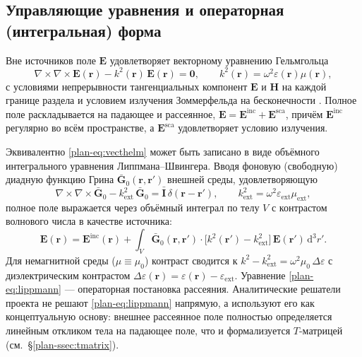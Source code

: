 \documentclass[11pt,a4paper]{article}
\begin{document}
\subsection{Управляющие уравнения и операторная (интегральная) форма}

Вне источников поле $\bm{E}$ удовлетворяет векторному уравнению Гельмгольца
\begin{equation}
\nabla\times\nabla\times\bm{E}(\bm{r})-k^2(\bm{r})\,\bm{E}(\bm{r})=\bm{0},
\qquad k^2(\bm{r})=\omega^2\varepsilon(\bm{r})\mu(\bm{r}),
\label{plan-eq:vecthelm}
\end{equation}
с условиями непрерывности тангенциальных компонент $\bm{E}$ и $\bm{H}$ на каждой границе раздела и условием излучения Зоммерфельда на бесконечности \cite{stratton1941}. Полное поле раскладывается на падающее и рассеянное, $\bm{E}=\bm{E}^{\mathrm{inc}}+\bm{E}^{\mathrm{sca}}$, причём $\bm{E}^{\mathrm{inc}}$ регулярно во всём пространстве, а $\bm{E}^{\mathrm{sca}}$ удовлетворяет условию излучения.

Эквивалентно \eqref{plan-eq:vecthelm} может быть записано в виде объёмного интегрального уравнения Липпмана--Швингера. Вводя фоновую (свободную) диадную функцию Грина $\bar{\bm{G}}_0(\bm{r},\bm{r}')$ внешней среды, удовлетворяющую
\begin{equation}
\nabla\times\nabla\times\bar{\bm{G}}_0-k_{\mathrm{ext}}^2\,\bar{\bm{G}}_0
=\bar{\bm{I}}\,\delta(\bm{r}-\bm{r}'),
\qquad k_{\mathrm{ext}}^2=\omega^2\varepsilon_{\mathrm{ext}}\mu_{\mathrm{ext}},
\label{plan-eq:greendyad}
\end{equation}
полное поле выражается через объёмный интеграл по телу $V$ с контрастом волнового числа в качестве источника:
\begin{equation}
\bm{E}(\bm{r})=\bm{E}^{\mathrm{inc}}(\bm{r})
+\int_{V}\bar{\bm{G}}_0(\bm{r},\bm{r}')\cdot
\big[k^2(\bm{r}')-k_{\mathrm{ext}}^2\big]\,\bm{E}(\bm{r}')\,\mathrm{d}^3 r'.
\label{plan-eq:lippmann}
\end{equation}
Для немагнитной среды ($\mu\equiv\mu_0$) контраст сводится к $k^2-k_{\mathrm{ext}}^2=\omega^2\mu_0\,\Delta\varepsilon$ с диэлектрическим контрастом $\Delta\varepsilon(\bm{r})=\varepsilon(\bm{r})-\varepsilon_{\mathrm{ext}}$. Уравнение \eqref{plan-eq:lippmann} --- операторная постановка рассеяния. Аналитические решатели проекта не решают \eqref{plan-eq:lippmann} напрямую, а используют его как концептуальную основу: внешнее рассеянное поле полностью определяется линейным откликом тела на падающее поле, что и формализуется $T$-матрицей (см.~\S\ref{plan-ssec:tmatrix}).
\end{document}
